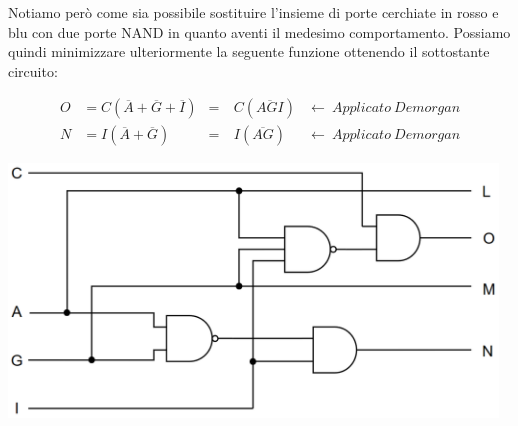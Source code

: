 \begin{questions}
\begin{solution}
            Notiamo però come sia possibile sostituire l'insieme di porte cerchiate in rosso e blu con due porte NAND in quanto aventi il medesimo comportamento. Possiamo quindi minimizzare ulteriormente la seguente funzione ottenendo il sottostante circuito:
            
            \vspace{-1.5em}
                        
            \begin{align*}
            	O &= C(\overline{A} + \overline{G} + \overline{I}) &=~& C(\overline{AGI}) 
            	&←~Applicato~Demorgan\\
            	N &= I(\overline{A} + \overline{G}) &=~& I(\overline{AG}) 
            	&←~Applicato~Demorgan
            \end{align*}    
            
            \vspace{-1.5em}

            \begin{center}
                    \includegraphics[width=13cm, keepaspectratio]{img/circuito_finale_minimizzato.png}
            \end{center}
    \end{solution}
\end{questions}
